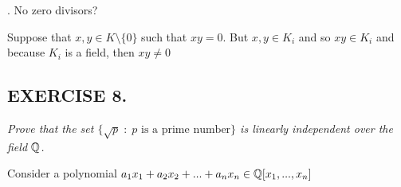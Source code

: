 \documentclass{article}
\begin{document}
. No zero divisors?

Suppose that $x,y\in K\setminus\{0\}$ such that $xy=0$. But $x,y\in K_i$ and so $xy\in K_i$ and because $K_i$ is a field, then $xy\neq 0$

\subsection*{EXERCISE 8.}
\emph{\color{pink}Prove that the set $\{\sqrt{p}\;:\;p\text{ is a prime number}\}$ is linearly independent over the field $\mathbb{Q}$.}
\smallskip

Consider a polynomial $a_1x_1+a_2x_2+...+a_nx_n\in\mathbb{Q}[x_1,...,x_n]$
\end{document}
